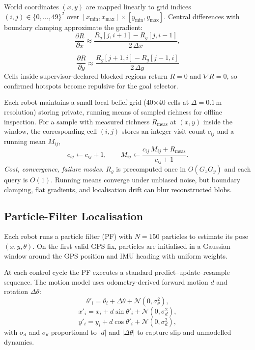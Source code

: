 \documentclass[lettersize,journal]{IEEEtran}
\begin{document}
World coordinates $(x,y)$ are mapped linearly to grid indices
$(i,j) \in \{0,\dots,49\}^2$ over
$[x_{\min},x_{\max}]\times[y_{\min},y_{\max}]$. Central differences with
boundary clamping approximate the gradient:
\begin{equation}
\frac{\partial R}{\partial x}\approx
\frac{R_g[j,i+1]-R_g[j,i-1]}{2\,\Delta x},
\end{equation}


\begin{equation}
\frac{\partial R}{\partial y}\approx
\frac{R_g[j+1,i]-R_g[j-1,i]}{2\,\Delta y}
\end{equation}
Cells inside supervisor-declared blocked regions return $R{=}0$ and
$\nabla R{=}0$, so confirmed hotspots become repulsive for the goal selector.

Each robot maintains a small local belief grid (40×40 cells at $\Delta = 0.1\,\mathrm{m}$
resolution) storing private, running means of sampled richness for offline inspection. For a sample with
measured richness $R_{\mathrm{meas}}$ at $(x,y)$ inside the window, the
corresponding cell $(i,j)$ stores an integer visit count $c_{ij}$ and a running
mean $M_{ij}$,
\[
c_{ij} \leftarrow c_{ij}+1,\qquad
M_{ij} \leftarrow \frac{c_{ij}\,M_{ij} + R_{\mathrm{meas}}}{c_{ij}+1}.
\]
\textit{Cost, convergence, failure modes.} $R_g$ is precomputed once in
$O(G_xG_y)$ and each query is $O(1)$. Running means converge under unbiased
noise, but boundary clamping, flat gradients, and localisation drift can blur
reconstructed blobs.

\subsection{Particle-Filter Localisation}

Each robot runs a particle filter (PF) with $N=150$ particles to estimate its
pose $(x,y,\theta)$. On the first valid GPS fix, particles are initialised in a
Gaussian window around the GPS position and IMU heading with uniform weights.

At each control cycle the PF executes a standard predict–update–resample
sequence. The motion model uses odometry-derived forward motion $d$ and
rotation $\Delta\theta$:
\[
\theta'_i = \theta_i + \Delta\theta + \mathcal{N}(0,\sigma_\theta^2),\]
\[x'_i = x_i + d\sin\theta'_i + \mathcal{N}(0,\sigma_d^2),\]
\[y'_i = y_i + d\cos\theta'_i + \mathcal{N}(0,\sigma_d^2),
\]
with $\sigma_d$ and $\sigma_\theta$ proportional to $|d|$ and $|\Delta\theta|$
to capture slip and unmodelled dynamics.
\end{document}
